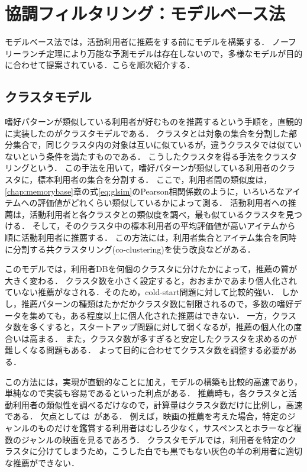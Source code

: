 \chapter{協調フィルタリング：モデルベース法}
\label{chap:modelbase}

モデルベース法では，活動利用者に推薦をする前にモデルを構築する．
ノーフリーランチ定理により万能な予測モデルは存在しないので，多様なモデルが目的に合わせて提案されている．こらを順次紹介する．

\section{クラスタモデル}
\label{sec:clustermodel}

嗜好パターンが類似している利用者が好むものを推薦するという手順を，直観的に実装したのがクラスタモデルである\cite{uai:98:01,epublist:039}．
クラスタとは対象の集合を分割した部分集合で，同じクラスタ内の対象は互いに似ているが，違うクラスタでは似ていないという条件を満たすものである．
こうしたクラスタを得る手法をクラスタリングという\cite{jpublist:034,jb:038:00,jb:020:00}．
この手法を用いて，嗜好パターンが類似している利用者のクラスタに，標本利用者の集合を分割する．
ここで，利用者間の類似度は，\ref{chap:memorybase}章の式\eqref{eq:glsim}のPearson相関係数のように，いろいろなアイテムへの評価値がどれくらい類似しているかによって測る．
活動利用者への推薦は，活動利用者と各クラスタとの類似度を調べ，最も似ているクラスタを見つける．
そして，そのクラスタ中の標本利用者の平均評価値が高いアイテムから順に活動利用者に推薦する．
この方法には，利用者集合とアイテム集合を同時に分割する共クラスタリング(co-clustering)を使う改良\cite{icdm:05:05}などがある．

このモデルでは，利用者DBを何個のクラスタに分けたかによって，推薦の質が大きく変わる．
クラスタ数を小さく設定すると，おおまかであまり個人化されていない推薦がなされる．そのため，cold-start問題に対して比較的強い．
しかし，推薦パターンの種類はたかだかクラスタ数に制限されるので，多数の嗜好データを集めても，ある程度以上に個人化された推薦はできない．
一方，クラスタ数を多くすると，スタートアップ問題に対して弱くなるが，推薦の個人化の度合いは高まる．
また，クラスタ数が多すぎると安定したクラスタを求めるのが難しくなる問題もある．
よって目的に合わせてクラスタ数を調整する必要がある．

この方法には，実現が直観的なことに加え，モデルの構築も比較的高速であり，単純なので実装も容易であるといった利点がある．
推薦時も，各クラスタと活動利用者の類似性を調べるだけなので，計算量はクラスタ数だけに比例し，高速である．
欠点としては~\cite{ej:048}がある．
例えば，映画の推薦を考えた場合，特定のジャンルのものだけを鑑賞する利用者はむしろ少なく，サスペンスとホラーなど複数のジャンルの映画を見るであろう．
クラスタモデルでは，利用者を特定のクラスタに分けてしまうため，こうした白でも黒でもない灰色の羊の利用者に適切な推薦ができない．


